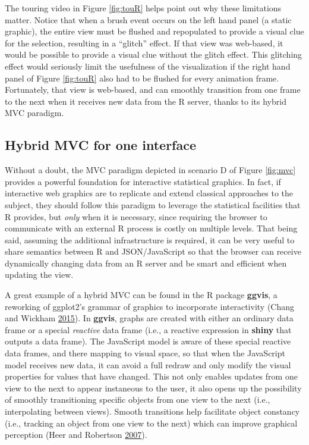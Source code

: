 \documentclass[12pt,]{isuthesis}
\begin{document}
The touring video in Figure \ref{fig:touR} helps point out why these
limitations matter. Notice that when a brush event occurs on the left
hand panel (a static graphic), the entire view must be flushed and
repopulated to provide a visual clue for the selection, resulting in a
``glitch'' effect. If that view was web-based, it would be possible to
provide a visual clue without the glitch effect. This glitching effect
would seriously limit the usefulness of the visualization if the right
hand panel of Figure \ref{fig:touR} also had to be flushed for every
animation frame. Fortunately, that view is web-based, and can smoothly
transition from one frame to the next when it receives new data from the
R server, thanks to its hybrid MVC paradigm.

\subsection{Hybrid MVC for one
interface}\label{hybrid-mvc-for-one-interface}

Without a doubt, the MVC paradigm depicted in scenario D of Figure
\ref{fig:mvc} provides a powerful foundation for interactive statistical
graphics. In fact, if interactive web graphics are to replicate and
extend classical approaches to the subject, they should follow this
paradigm to leverage the statistical facilities that R provides, but
\emph{only} when it is necessary, since requiring the browser to
communicate with an external R process is costly on multiple levels.
That being said, assuming the additional infrastructure is required, it
can be very useful to share semantics between R and JSON/JavaScript so
that the browser can receive dynamically changing data from an R server
and be smart and efficient when updating the view.

A great example of a hybrid MVC can be found in the R package
\textbf{ggvis}, a reworking of ggplot2's grammar of graphics to
incorporate interactivity (Chang and Wickham
\protect\hyperlink{ref-ggvis}{2015}). In \textbf{ggvis}, graphs are
created with either an ordinary data frame or a special \emph{reactive}
data frame (i.e., a reactive expression in \textbf{shiny} that outputs a
data frame). The JavaScript model is aware of these special reactive
data frames, and there mapping to visual space, so that when the
JavaScript model receives new data, it can avoid a full redraw and only
modify the visual properties for values that have changed. This not only
enables updates from one view to the next to appear instaneous to the
user, it also opens up the possibility of smoothly transitioning
specific objects from one view to the next (i.e., interpolating between
views). Smooth transitions help facilitate object constancy (i.e.,
tracking an object from one view to the next) which can improve
graphical perception (Heer and Robertson
\protect\hyperlink{ref-animated-transitions}{2007}).
\end{document}

